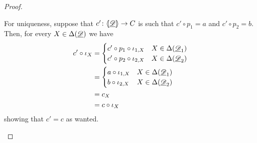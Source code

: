 \begin{proof}
\begin{enumerate}
	For uniqueness, suppose that $c'\colon \langle \hspace{-1.85pt}[ \underline{\mathscr{D}}]\hspace{-1.85pt}\rangle\to C$ is such that $c'\circ p_1=a$ and  $c'\circ p_2 = b$. Then, for every $X\in \Delta(\underline{\mathscr{D}})$ we have
\begin{align*}
	c'\circ \iota_X &= \begin{cases}
	c'\circ p_1\circ \iota_{1, X} & X\in \Delta(\underline{\mathscr{D}}_1)\\
	c'\circ p_2\circ \iota_{2, X} & X\in \Delta(\underline{\mathscr{D}}_2)
	\end{cases}\\&=\begin{cases}
a\circ \iota_{1, X} & X\in \Delta(\underline{\mathscr{D}}_1)\\
b\circ \iota_{2, X} & X\in \Delta(\underline{\mathscr{D}}_2)
	\end{cases}\\&=c_X\\&=c\circ \iota_X
\end{align*}
showing that $c'=c$ as wanted.	 \qedhere 
	\end{enumerate}
\end{proof}

